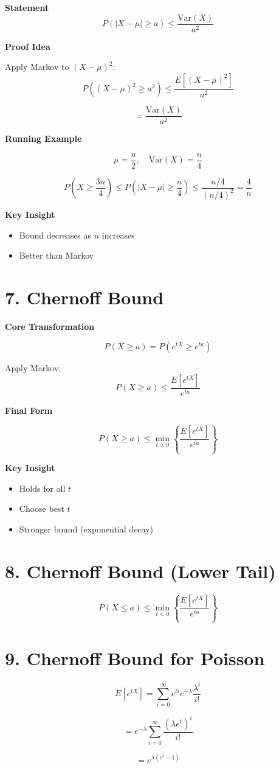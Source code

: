 \documentclass[12pt]{article}
\begin{document}
\textbf{Statement}
\[
P(|X - \mu| \geq a) \leq \frac{\text{Var}(X)}{a^2}
\]

\textbf{Proof Idea}

Apply Markov to $(X-\mu)^2$:
\[
P((X-\mu)^2 \geq a^2) \leq \frac{E[(X-\mu)^2]}{a^2}
\]

\[
= \frac{\text{Var}(X)}{a^2}
\]

\textbf{Running Example}

\[
\mu = \frac{n}{2}, \quad \text{Var}(X) = \frac{n}{4}
\]

\[
P\left(X \geq \frac{3n}{4}\right)
\leq P\left(|X - \mu| \geq \frac{n}{4}\right)
\leq \frac{n/4}{(n/4)^2} = \frac{4}{n}
\]

\textbf{Key Insight}
\begin{itemize}
\item Bound decreases as $n$ increases
\item Better than Markov
\end{itemize}

\section*{7. Chernoff Bound}

\textbf{Core Transformation}

\[
P(X \geq a) = P(e^{tX} \geq e^{ta})
\]

Apply Markov:
\[
P(X \geq a) \leq \frac{E[e^{tX}]}{e^{ta}}
\]

\textbf{Final Form}

\[
P(X \geq a) \leq \min_{t>0} \left\{ \frac{E[e^{tX}]}{e^{ta}} \right\}
\]

\textbf{Key Insight}
\begin{itemize}
\item Holds for all $t$
\item Choose best $t$
\item Stronger bound (exponential decay)
\end{itemize}

\section*{8. Chernoff Bound (Lower Tail)}

\[
P(X \leq a) \leq \min_{t<0} \left\{ \frac{E[e^{tX}]}{e^{ta}} \right\}
\]

\section*{9. Chernoff Bound for Poisson}

\[
E[e^{tX}] = \sum_{i=0}^{\infty} e^{ti} e^{-\lambda} \frac{\lambda^i}{i!}
\]

\[
= e^{-\lambda} \sum_{i=0}^{\infty} \frac{(\lambda e^t)^i}{i!}
\]

\[
= e^{\lambda(e^t - 1)}
\]
\end{document}
